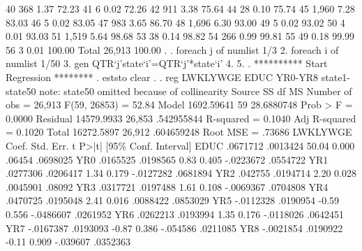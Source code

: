          40 {\VBAR}        368        1.37       72.23
         41 {\VBAR}          6        0.02       72.26
         42 {\VBAR}        911        3.38       75.64
         44 {\VBAR}         28        0.10       75.74
         45 {\VBAR}      1,960        7.28       83.03
         46 {\VBAR}          5        0.02       83.05
         47 {\VBAR}        983        3.65       86.70
         48 {\VBAR}      1,696        6.30       93.00
         49 {\VBAR}          5        0.02       93.02
         50 {\VBAR}          4        0.01       93.03
         51 {\VBAR}      1,519        5.64       98.68
         53 {\VBAR}         38        0.14       98.82
         54 {\VBAR}        266        0.99       99.81
         55 {\VBAR}         49        0.18       99.99
         56 {\VBAR}          3        0.01      100.00
      Total {\VBAR}     26,913      100.00
{\smallskip}
. 
. foreach j of numlist 1/3 {\lbr}
  2. foreach i of numlist 1/50 {\lbr}
  3. gen QTR`j'state`i'=QTR`j'*state`i'
  4. {\rbr}
  5. {\rbr}
{\smallskip}
. **********  Start Regression ********
. eststo clear
{\smallskip}
. 
. reg  LWKLYWGE EDUC  YR0-YR8 state1-state50
note: state50 omitted because of collinearity
{\smallskip}
      Source {\VBAR}       SS           df       MS      Number of obs   =    26,913
   F(59, 26853)    =     52.84
       Model {\VBAR}  1692.59641        59  28.6880748   Prob > F        =    0.0000
    Residual {\VBAR}  14579.9933    26,853  .542955844   R-squared       =    0.1040
   Adj R-squared   =    0.1020
       Total {\VBAR}  16272.5897    26,912  .604659248   Root MSE        =    .73686
{\smallskip}
    LWKLYWGE {\VBAR}      Coef.   Std. Err.      t    P>|t|     [95\% Conf. Interval]
        EDUC {\VBAR}   .0671712   .0013424    50.04   0.000       .06454    .0698025
         YR0 {\VBAR}   .0165525   .0198565     0.83   0.405    -.0223672    .0554722
         YR1 {\VBAR}   .0277306   .0206417     1.34   0.179    -.0127282    .0681894
         YR2 {\VBAR}    .042755   .0194714     2.20   0.028     .0045901      .08092
         YR3 {\VBAR}   .0317721   .0197488     1.61   0.108    -.0069367    .0704808
         YR4 {\VBAR}   .0470725   .0195048     2.41   0.016     .0088422    .0853029
         YR5 {\VBAR}  -.0112328   .0190954    -0.59   0.556    -.0486607    .0261952
         YR6 {\VBAR}   .0262213   .0193994     1.35   0.176    -.0118026    .0642451
         YR7 {\VBAR}  -.0167387   .0193093    -0.87   0.386     -.054586    .0211085
         YR8 {\VBAR}  -.0021854   .0190922    -0.11   0.909     -.039607    .0352363

